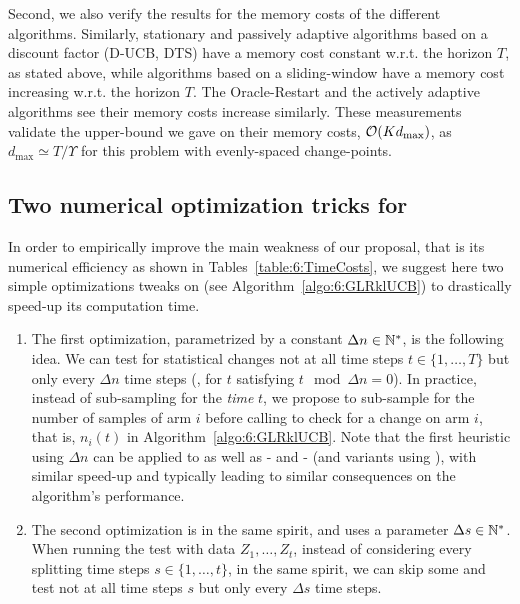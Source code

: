 Second, we also verify the results for the memory costs of the different algorithms.
Similarly, stationary and passively adaptive algorithms based on a discount factor (D-UCB, DTS) have a memory cost constant w.r.t. the horizon $T$, as stated above,
while algorithms based on a sliding-window have a memory cost increasing w.r.t. the horizon $T$.
The Oracle-Restart and the actively adaptive algorithms see their memory costs increase similarly.
These measurements validate the upper-bound we gave on their memory costs, $\mathop{}\mathopen{}\mathcal{O}\mathopen{}\left(K d_{\max}\right)$, as $d_{\max} \simeq T / \Upsilon$ for this problem with evenly-spaced change-points.


\subsection{Two numerical optimization tricks for \GLRklUCB}\label{sub:6:IdeasOptimizations}

In order to empirically improve the main weakness of our proposal, that is its numerical efficiency as shown in Tables~\ref{table:6:TimeCosts},
we suggest here two simple optimizations tweaks on \GLRklUCB{} (see Algorithm~\ref{algo:6:GLRklUCB}) to drastically speed-up its computation time.

\begin{enumerate}
    \item
    The first optimization, parametrized by a constant $\Delta n \in\mathbb{N}^*$, is the following idea.
    We can test for statistical changes not at all time steps $t\in\{1,\dots,T\}$ but only every $\Delta n$ time steps (\ie, for $t$ satisfying $t \mod \Delta n = 0$).
    In practice, instead of sub-sampling for the \emph{time} $t$, we propose to sub-sample for the number of samples of arm $i$ before calling \GLR{} to check for a change on arm $i$, that is, $n_i(t)$ in Algorithm~\ref{algo:6:GLRklUCB}.
    Note that the first heuristic using $\Delta n$ can be applied to \MUCB{} as well as \CUSUM-\UCB{} and \PHT-\UCB{} (and variants using \klUCB), with similar speed-up and typically leading to similar consequences on the algorithm's performance.

    \item
    The second optimization is in the same spirit, and uses a parameter $\Delta s \in\mathbb{N}^*$.
    When running the \GLR{} test with data $Z_1,\dots,Z_t$, instead of considering every splitting time steps $s\in\{1,\dots,t\}$, in the same spirit, we can skip some and test not at all time steps $s$ but only every $\Delta s$ time steps.
\end{enumerate}

